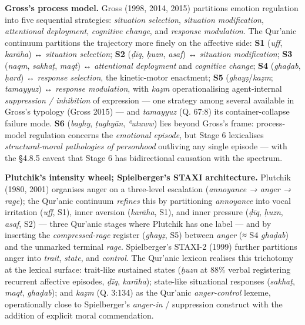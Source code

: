 \textbf{Gross's process model.} Gross (1998, 2014, 2015) partitions
emotion regulation into five sequential strategies: \emph{situation
selection}, \emph{situation modification}, \emph{attentional
deployment}, \emph{cognitive change}, and \emph{response modulation}.
The Qur'anic continuum partitions the trajectory more finely on the
affective side: \textbf{S1} (\emph{uff}, \emph{karāha}) ↔
\emph{situation selection}; \textbf{S2} (\emph{ḍīq}, \emph{ḥuzn},
\emph{asaf}) ↔ \emph{situation modification}; \textbf{S3} (\emph{naqm},
\emph{sakhaṭ}, \emph{maqt}) ↔ \emph{attentional deployment} and
\emph{cognitive change}; \textbf{S4} (\emph{ghaḍab}, \emph{ḥard}) ↔
\emph{response selection}, the kinetic-motor enactment; \textbf{S5}
(\emph{ghayẓ}/\emph{kaẓm}; \emph{tamayyuz}) ↔ \emph{response
modulation}, with \emph{kaẓm} operationalising agent-internal
\emph{suppression / inhibition} of expression --- one strategy among
several available in Gross's typology (Gross 2015) --- and
\emph{tamayyuz} (Q. 67:8) its container-collapse failure mode.
\textbf{S6} (\emph{baghy}, \emph{ṭughyān}, \emph{ʿutuww}) lies beyond
Gross's frame: process-model regulation concerns the \emph{emotional
episode}, but Stage 6 lexicalises \emph{structural-moral pathologies of
personhood} outliving any single episode --- with the §4.8.5 caveat that
Stage 6 has bidirectional causation with the spectrum.

\textbf{Plutchik's intensity wheel; Spielberger's STAXI architecture.}
Plutchik (1980, 2001) organises anger on a three-level escalation
(\emph{annoyance → anger → rage}); the Qur'anic continuum \emph{refines}
this by partitioning \emph{annoyance} into vocal irritation (\emph{uff},
S1), inner aversion (\emph{karāha}, S1), and inner pressure (\emph{ḍīq},
\emph{ḥuzn}, \emph{asaf}, S2) --- three Qur'anic stages where Plutchik
has one label --- and by inserting the \emph{compressed-rage} register
(\emph{ghayẓ}, S5) between \emph{anger} (≈ S4 \emph{ghaḍab}) and the
unmarked terminal \emph{rage}. Spielberger's STAXI-2 (1999) further
partitions anger into \emph{trait}, \emph{state}, and \emph{control}.
The Qur'anic lexicon realises this trichotomy at the lexical surface:
trait-like sustained states (\emph{ḥuzn} at 88\% verbal registering
recurrent affective episodes, \emph{ḍīq}, \emph{karāha}); state-like
situational responses (\emph{sakhaṭ}, \emph{maqt}, \emph{ghaḍab}); and
\emph{kaẓm} (Q. 3:134) as the Qur'anic \emph{anger-control} lexeme,
operationally close to Spielberger's \emph{anger-in} / suppression
construct with the addition of explicit moral commendation.

